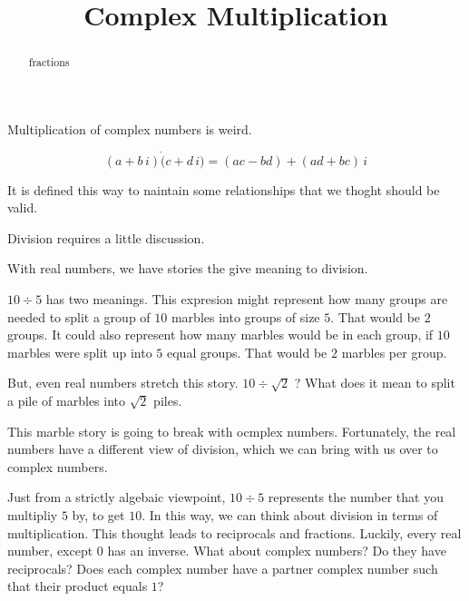 \documentclass{ximera}
\title{Complex Multiplication}
\begin{document}
\begin{abstract}
fractions
\end{abstract}
\maketitle


Multiplication of complex numbers is weird.





\begin{definition}


\[    (a + b \, i) \dot (c + d \, i) = (ac-bd) + (ad+bc) \, i           \]

\end{definition}


It is defined this way to naintain some relationships that we thoght should be valid.



Division requires a little discussion.



With real numbers, we have stories the give meaning to division.


$10 \div 5$ has two meanings.  This expresion might represent how many groups are needed to split a group of $10$ marbles into groups of size $5$.  That would be $2$ groups.  It could also represent how many marbles would be in each group, if $10$ marbles were split up into $5$ equal groups.  That would be $2$ marbles per group.


But, even real numbers stretch this story.  $10 \div \sqrt{2}$ ?  What does it mean to split a pile of marbles into $\sqrt{2}$ piles.

This marble story is going to break with ocmplex numbers.  Fortunately, the real numbers have a different view of division, which we can bring with us over to complex numbers.





Just from a strictly algebaic viewpoint, $10 \div 5$ represents the number that you multipliy $5$ by, to get $10$.  In this way, we can think about division in terms of multiplication.  This thought leads to reciprocals and fractions.  Luckily, every real number, except $0$ has an inverse.  What about complex numbers?  Do they have reciprocals?  Does each complex number have a partner complex number such that their product equals $1$?
\end{document}
